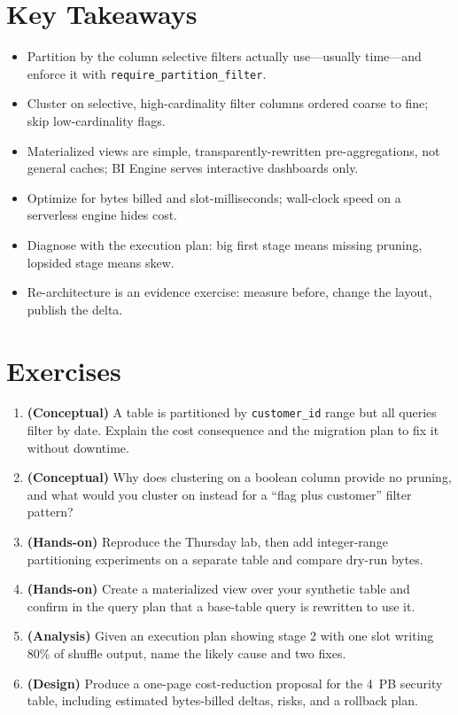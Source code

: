 \section*{Key Takeaways}
\begin{itemize}
    \item Partition by the column selective filters actually use---usually time---and enforce it with \texttt{require\_partition\_filter}.
    \item Cluster on selective, high-cardinality filter columns ordered coarse to fine; skip low-cardinality flags.
    \item Materialized views are simple, transparently-rewritten pre-aggregations, not general caches; BI Engine serves interactive dashboards only.
    \item Optimize for bytes billed and slot-milliseconds; wall-clock speed on a serverless engine hides cost.
    \item Diagnose with the execution plan: big first stage means missing pruning, lopsided stage means skew.
    \item Re-architecture is an evidence exercise: measure before, change the layout, publish the delta.
\end{itemize}

\section{Exercises}
\begin{enumerate}
    \item \textbf{(Conceptual)} A table is partitioned by \texttt{customer\_id} range but all queries filter by date. Explain the cost consequence and the migration plan to fix it without downtime.
    \item \textbf{(Conceptual)} Why does clustering on a boolean column provide no pruning, and what would you cluster on instead for a ``flag plus customer'' filter pattern?
    \item \textbf{(Hands-on)} Reproduce the Thursday lab, then add integer-range partitioning experiments on a separate table and compare dry-run bytes.
    \item \textbf{(Hands-on)} Create a materialized view over your synthetic table and confirm in the query plan that a base-table query is rewritten to use it.
    \item \textbf{(Analysis)} Given an execution plan showing stage 2 with one slot writing 80\% of shuffle output, name the likely cause and two fixes.
    \item \textbf{(Design)} Produce a one-page cost-reduction proposal for the 4~PB security table, including estimated bytes-billed deltas, risks, and a rollback plan.
\end{enumerate}
